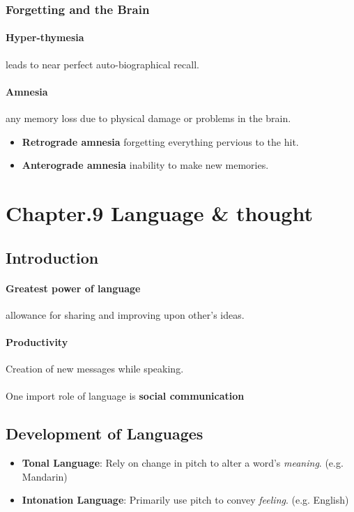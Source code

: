 \documentclass{article}
\begin{document}
	\subsubsection{Forgetting and the Brain}
	\paragraph{Hyper-thymesia} leads to near perfect auto-biographical recall.
	\paragraph{Amnesia} any memory loss due to physical damage or problems in the brain.
	\begin{itemize}
		\item \textbf{Retrograde amnesia} forgetting everything pervious to the hit.
		\item \textbf{Anterograde amnesia} inability to make new memories.
	\end{itemize}
	
	\section{Chapter.9 Language \& thought}
	\subsection{Introduction}
	\paragraph{Greatest power of language} allowance for sharing and improving upon other's ideas.
	\paragraph{Productivity} Creation of new messages while speaking.
	\paragraph{} One import role of language is \textbf{social communication}
	\subsection{Development of Languages}
	\begin{itemize}
		\item \textbf{Tonal Language}: Rely on change in pitch to alter a word's \emph{meaning}. (e.g. Mandarin)
		\item \textbf{Intonation Language}: Primarily use pitch to convey \emph{feeling}. (e.g. English)
	\end{itemize}
\end{document}
